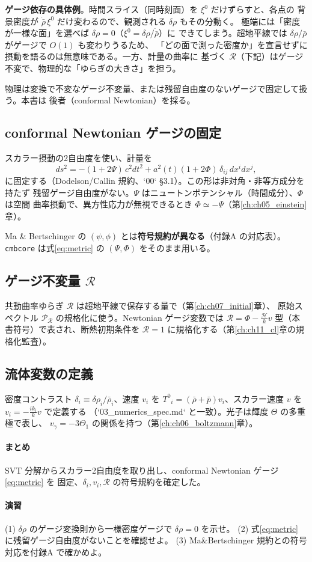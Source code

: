 \begin{intuition}
\textbf{ゲージ依存の具体例}。時間スライス（同時刻面）を $\xi^0$ だけずらすと、各点の
背景密度が $\dot{\bar\rho}\,\xi^0$ だけ変わるので、観測される $\delta\rho$ もその分動く。
極端には「密度が一様な面」を選べば $\delta\rho=0$（$\xi^0=\delta\rho/\dot{\bar\rho}$）に
できてしまう。超地平線では $\delta\rho/\bar\rho$ がゲージで $O(1)$ も変わりうるため、
「どの面で測った密度か」を宣言せずに摂動を語るのは無意味である。一方、計量の曲率に
基づく $\mathcal R$（下記）はゲージ不変で、物理的な「ゆらぎの大きさ」を担う。
\end{intuition}

物理は変換で不変なゲージ不変量、または残留自由度のないゲージで固定して扱う。本書は
後者（conformal Newtonian）を採る。

\subsection{conformal Newtonian ゲージの固定}
スカラー摂動の2自由度を使い、計量を
\begin{equation}
  ds^2=-(1+2\Psi)\,c^2dt^2+a^2(t)(1+2\Phi)\,\delta_{ij}\,dx^idx^j,
  \label{eq:metric}
\end{equation}
に固定する（Dodelson/Callin 規約、`00` §3.1）。この形は非対角・非等方成分を持たず
残留ゲージ自由度がない。$\Psi$ はニュートンポテンシャル（時間成分）、$\Phi$ は空間
曲率摂動で、異方性応力が無視できるとき $\Phi\simeq-\Psi$（第\ref{ch:ch05_einstein}章）。

\begin{numreality}
Ma \& Bertschinger の $(\psi,\phi)$ とは\textbf{符号規約が異なる}（付録A の対応表）。
\texttt{cmbcore} は式\eqref{eq:metric} の $(\Psi,\Phi)$ をそのまま用いる。
\end{numreality}

\subsection{ゲージ不変量 $\mathcal R$}
共動曲率ゆらぎ $\mathcal R$ は超地平線で保存する量で（第\ref{ch:ch07_initial}章）、
原始スペクトル $\mathcal P_\mathcal R$ の規格化に使う。Newtonian ゲージ変数では
$\mathcal R=\Phi-\frac{\mathcal H}{k}v$ 型（本書符号）で表され、断熱初期条件を
$\mathcal R=1$ に規格化する（第\ref{ch:ch11_cl}章の規格化監査）。

\subsection{流体変数の定義}
密度コントラスト $\delta_i\equiv\delta\rho_i/\bar\rho_i$、速度 $v_i$ を
$T^0{}_i=(\bar\rho+\bar p)v_i$、スカラー速度 $v$ を $v_i=-\frac{ik_i}{k}v$ で定義する
（`03_numerics_spec.md` と一致）。光子は輝度 $\Theta$ の多重極で表し、
$v_\gamma=-3\Theta_1$ の関係を持つ（第\ref{ch:ch06_boltzmann}章）。

\paragraph{まとめ}
SVT 分解からスカラー2自由度を取り出し、conformal Newtonian ゲージ\eqref{eq:metric} を
固定、$\delta_i,v_i,\mathcal R$ の符号規約を確定した。

\paragraph{演習}
(1) $\delta\rho$ のゲージ変換則から一様密度ゲージで $\delta\rho=0$ を示せ。
(2) 式\eqref{eq:metric} に残留ゲージ自由度がないことを確認せよ。
(3) Ma\&Bertschinger 規約との符号対応を付録A で確かめよ。
